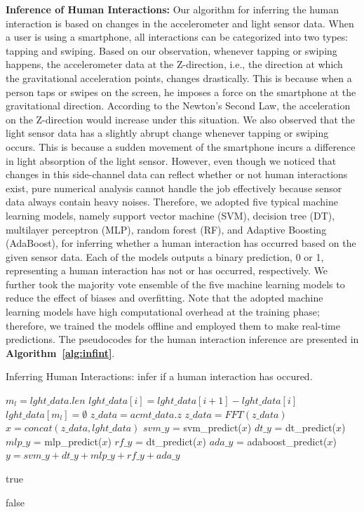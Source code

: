 \documentclass[letterpaper,12pt]{article}
\begin{document}
\textbf{Inference of Human Interactions:} 
Our algorithm for inferring the human interaction is based on changes in the accelerometer and light sensor data. When a user is using a smartphone, all interactions can be categorized into two types: tapping and swiping. Based on our observation, whenever tapping or swiping happens, the accelerometer data at the Z-direction, i.e., the direction at which the gravitational acceleration points,  changes drastically. This is because when a person taps or swipes on the screen, he imposes a force on the smartphone at the gravitational direction. According to the Newton's Second Law, the acceleration on the Z-direction would increase under this situation. We also observed that the light sensor data has a slightly abrupt change whenever tapping or swiping occurs. This is because a sudden movement of the smartphone incurs a difference in light absorption of the light sensor. However, even though we noticed that changes in this side-channel data can reflect whether or not human interactions exist, pure numerical analysis cannot handle the job effectively because sensor data always contain heavy noises. Therefore, we adopted five typical machine learning models, namely support vector machine (SVM), decision tree (DT), multilayer perceptron (MLP), random forest (RF), and  Adaptive Boosting (AdaBoost), for inferring whether a human interaction has occurred based on the given sensor data. Each of the models outputs a binary prediction, 0 or 1, representing a human interaction has not or has occurred, respectively. We further took the majority vote ensemble of the five machine learning models to reduce the effect of biases and overfitting. Note that the adopted machine learning models have high computational overhead at the training phase; therefore, we trained the models offline and employed them to make real-time predictions. The pseudocodes for the human interaction inference are presented in {\bf Algorithm~\ref{alg:infint}}.


\begin{algorithm}[!htb]
\caption{Inferring Human Interactions: infer if a human interaction has occured.}\label{alg:infint}
\begin{algorithmic}[1]
\State $m_l=lght\_data.len$
\State $lght\_data[i]=lght\_data[i+1]-lght\_data[i]$
\EndFor
\State $lght\_data[m_l]=\emptyset$
\State $z\_data=acmt\_data.z$
\State $z\_data=FFT(z\_data)$
\State $x = concat(z\_data,lght\_data)$
\State $svm\_y$ = svm\_predict($x$)
\State $dt\_y$ = dt\_predict($x$)
\State $mlp\_y$ = mlp\_predict($x$)
\State $rf\_y$ = dt\_predict($x$)
\State $ada\_y$ = adaboost\_predict($x$)
\State $y=svm\_y+dt\_y+mlp\_y+rf\_y+ada\_y$

\Return true
\Else

\Return false
\EndIf
\EndProcedure
\end{algorithmic}
\end{algorithm}
\end{document}
